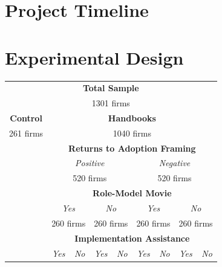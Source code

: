 \documentclass[11.5pt]{article}
\begin{document}
{\begin{appendices}
\begin{enumerate}
\end{enumerate}
\pagebreak
\section{Project Timeline} \label{sec.timeline}

\begin{figure}[h]
    \centering
    
\end{figure}

\pagebreak
\section{Experimental Design} \label{sec:design}

\begin{table}[h!]
  \centering
  \renewcommand{\arraystretch}{1.4}
  \begin{tabular}{|c|c|c|c|c|c|c|c|c|}
    \hline
    \multicolumn{9}{|c|}{\textbf{Total Sample}}\\
    \multicolumn{9}{|c|}{1301 firms}\\
    \hline
    \multicolumn{1}{|c}{\textbf{Control}} & \multicolumn{8}{|c|}{\textbf{Handbooks}}\\
    \multicolumn{1}{|c}{261 firms} & \multicolumn{8}{|c|}{1040 firms}\\
    \cline{2-9}
    \multicolumn{1}{|c}{} & \multicolumn{8}{|c|}{\textbf{Returns to Adoption Framing}}\\
    \cline{2-9}
    \multicolumn{1}{|c}{} & \multicolumn{4}{|c}{\textit{Positive}} & \multicolumn{4}{|c|}{\textit{Negative}}\\
    \multicolumn{1}{|c}{} & \multicolumn{4}{|c}{520 firms} & \multicolumn{4}{|c|}{520 firms}\\
    \cline{2-9}
    \multicolumn{1}{|c}{} & \multicolumn{8}{|c|}{\textbf{Role-Model Movie}}\\
    \cline{2-9}
    \multicolumn{1}{|c}{} & \multicolumn{2}{|c}{\textit{Yes}} & \multicolumn{2}{|c}{\textit{No}} & \multicolumn{2}{|c}{\textit{Yes}} & \multicolumn{2}{|c|}{\textit{No}}\\
    \multicolumn{1}{|c}{} & \multicolumn{2}{|c}{260 firms} & \multicolumn{2}{|c}{260 firms} & \multicolumn{2}{|c}{260 firms} & \multicolumn{2}{|c|}{260 firms}\\
    \cline{2-9}
    \multicolumn{1}{|c}{} & \multicolumn{8}{|c|}{\textbf{Implementation Assistance}}\\
    \cline{2-9}
    \multicolumn{1}{|c}{} & \multicolumn{1}{|c}{\textit{Yes}} & \multicolumn{1}{|c}{\textit{No}} & \multicolumn{1}{|c}{\textit{Yes}} & \multicolumn{1}{|c}{\textit{No}} & \multicolumn{1}{|c}{\textit{Yes}} & \multicolumn{1}{|c}{\textit{No}} & \multicolumn{1}{|c}{\textit{Yes}} & \multicolumn{1}{|c|}{\textit{No}}\\

\end{tabular}
\end{table}
\end{appendices}}
\end{document}
